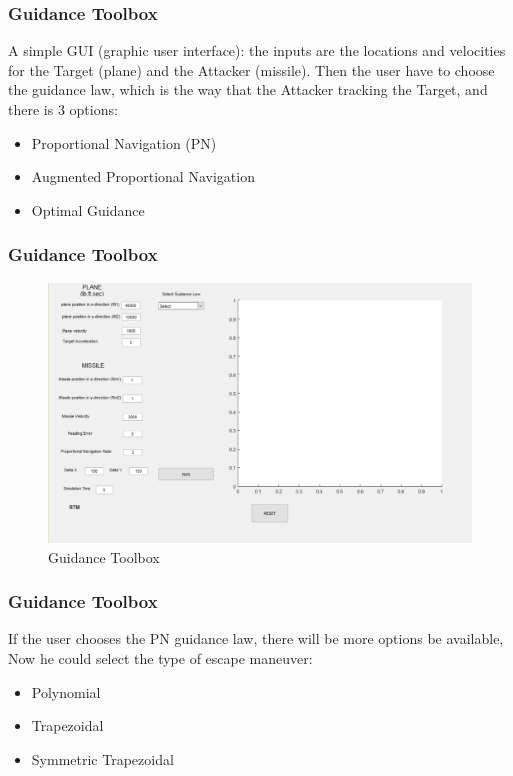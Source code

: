 \documentclass{beamer}
\begin{document}
\begin{frame}
\frametitle{Guidance Toolbox}
A simple GUI (graphic user interface): the inputs are the locations and velocities for the Target (plane) and the Attacker (missile). Then the user have to choose the guidance law, which is the way that the Attacker tracking the Target, and there is 3 options:
\begin{itemize}
	\item Proportional Navigation (PN)
	\item Augmented Proportional Navigation
	\item Optimal Guidance
\end{itemize} 
\end{frame}
\begin{frame}
\frametitle{Guidance Toolbox}
\begin{figure}[H]
	\centering
	\includegraphics[scale = 0.35]{fig/GUI.PNG}
	\caption{Guidance Toolbox}
	\label{Guidance Toolbox}
\end{figure}
\end{frame}
\begin{frame}
\frametitle{Guidance Toolbox}
If the user chooses the PN guidance law, there will be more options be available, Now he could select the type of escape maneuver:
\begin{itemize}
	\item Polynomial
	\item Trapezoidal
	\item Symmetric Trapezoidal
\end{itemize}
\end{frame}
\end{document}
